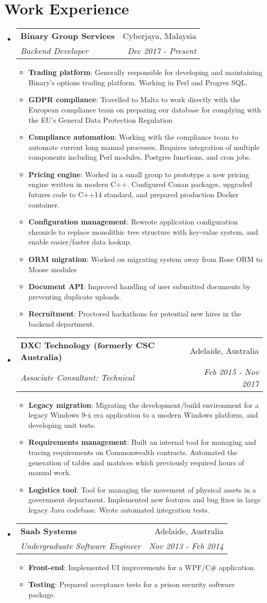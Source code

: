 \documentclass[a4paper,11pt]{article}
\makeatletter
\newcommand{\resumeItem}[2]{
  \item\small{
    \textbf{#1}{: #2 \vspace{-2pt}}
  }
}
\newcommand{\resumeSubheading}[4]{
  \vspace{-1pt}\item
    \begin{tabular*}{0.97\textwidth}[t]{l@{\extracolsep{\fill}}r}
      \textbf{#1} & #2 \\
      \textit{\small#3} & \textit{\small #4} \\
    \end{tabular*}\vspace{-5pt}
}
\newcommand{\resumeSubHeadingListStart}{\begin{itemize}[label={}, leftmargin=*]}
\newcommand{\resumeSubHeadingListEnd}{\end{itemize}}
\newcommand{\resumeItemListStart}{\begin{itemize}[label={}]}
\newcommand{\resumeItemListEnd}{\end{itemize}\vspace{-5pt}}
\makeatother
\begin{document}
\section{Work Experience}
\resumeSubHeadingListStart
\resumeSubheading
{Binary Group Services}{Cyberjaya, Malaysia}
{Backend Developer}{Dec 2017 - Present}
\resumeItemListStart
\resumeItem{Trading platform}
    {Generally responsible for developing and maintaining Binary's options trading platform. Working in Perl and Progres SQL.}
\resumeItem{GDPR compliance}
    {Travelled to Malta to work directly with the European compliance team on preparing our database for complying with the EU's General Data Protection Regulation}
\resumeItem{Compliance automation}
    {Working with the compliance team to automate current long manual processes. Requires integration of multiple components including Perl modules, Postgres functions, and cron jobs.}
\resumeItem{Pricing engine}
    {Worked in a small group to prototype a new pricing engine written in modern C++. Configured Conan packages, upgraded futures code to C++14 standard, and prepared production Docker container.}
\resumeItem{Configuration management}
    {Rewrote application configuration chronicle to replace monolithic tree structure with key-value system, and enable easier/faster data lookup.}
\resumeItem{ORM migration}
    {Worked on migrating system away from Rose ORM to Moose modules}
\resumeItem{Document API}
    {Improved handling of user submitted documents by preventing duplicate uploads.}
\resumeItem{Recruitment}
    {Proctored hackathons for potential new hires in the backend department.}
\resumeItemListEnd
\resumeSubheading
{DXC Technology (formerly CSC Australia)}{Adelaide, Australia}
{Associate Consultant: Technical}{Feb 2015 - Nov 2017}
\resumeItemListStart
\resumeItem{Legacy migration}
    {Migrating the development/build environment for a legacy Windows 9-x era application to a modern Windows platform, and developing unit tests.}
\resumeItem{Requirements management}
    {Built an internal tool for managing and tracing requirements on Commonwealth contracts. Automated the generation of tables and matrices which previously required hours of manual work.}
\resumeItem{Logistics tool}
    {Tool for managing the movement of physical assets in a government department. Implemented new features and bug fixes in large legacy Java codebase. Wrote automated integration tests.}
\resumeItemListEnd
\resumeSubheading
{Saab Systems}{Adelaide, Australia}
{Undergraduate Software Engineer}{Nov 2013 - Feb 2014}
\resumeItemListStart
\resumeItem{Front-end}
    {Implemented UI improvements for a WPF/C\# application.}
\resumeItem{Testing}
    {Prepared acceptance tests for a prison security software package.}
\resumeItemListEnd
\resumeSubHeadingListEnd
\end{document}
